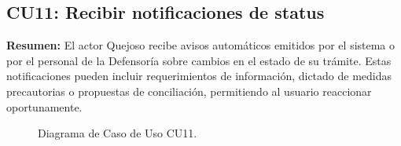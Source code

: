 \begin{appendices}
\subsection{CU11: Recibir notificaciones de status}

\textbf{Resumen:} 
El actor Quejoso recibe avisos automáticos emitidos por el sistema o por el personal de la Defensoría sobre cambios en el estado de su trámite. Estas notificaciones pueden incluir requerimientos de información, dictado de medidas precautorias o propuestas de conciliación, permitiendo al usuario reaccionar oportunamente.

\begin{figure}[htbp]
    \centering
    \figCUonce
    \caption{Diagrama de Caso de Uso CU11.}
    \label{fig:cu11}
\end{figure}


\end{appendices}
